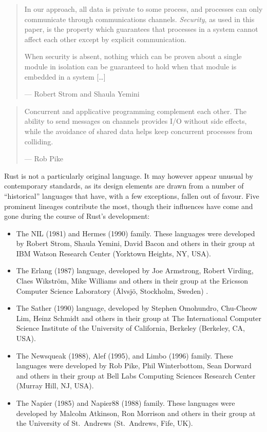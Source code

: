 \documentclass[]{article}
\begin{document}
\begin{quote}
In our approach, all data is private to some process, and processes can
only communicate through communications channels. \emph{Security}, as
used in this paper, is the property which guarantees that processes in a
system cannot affect each other except by explicit communication.

When security is absent, nothing which can be proven about a single
module in isolation can be guaranteed to hold when that module is
embedded in a system {[}\ldots{}{]}

--- Robert Strom and Shaula Yemini
\end{quote}

\begin{quote}
Concurrent and applicative programming complement each other. The
ability to send messages on channels provides I/O without side effects,
while the avoidance of shared data helps keep concurrent processes from
colliding.

--- Rob Pike
\end{quote}

Rust is not a particularly original language. It may however appear
unusual by contemporary standards, as its design elements are drawn from
a number of ``historical'' languages that have, with a few exceptions,
fallen out of favour. Five prominent lineages contribute the most,
though their influences have come and gone during the course of Rust's
development:

\begin{itemize}
\item
  The NIL (1981) and Hermes (1990) family. These languages were
  developed by Robert Strom, Shaula Yemini, David Bacon and others in
  their group at IBM Watson Research Center (Yorktown Heights, NY, USA).
\item
  The Erlang (1987) language, developed by Joe Armstrong, Robert
  Virding, Claes Wikström, Mike Williams and others in their group at
  the Ericsson Computer Science Laboratory (Älvsjö, Stockholm, Sweden) .
\item
  The Sather (1990) language, developed by Stephen Omohundro, Chu-Cheow
  Lim, Heinz Schmidt and others in their group at The International
  Computer Science Institute of the University of California, Berkeley
  (Berkeley, CA, USA).
\item
  The Newsqueak (1988), Alef (1995), and Limbo (1996) family. These
  languages were developed by Rob Pike, Phil Winterbottom, Sean Dorward
  and others in their group at Bell Labs Computing Sciences Research
  Center (Murray Hill, NJ, USA).
\item
  The Napier (1985) and Napier88 (1988) family. These languages were
  developed by Malcolm Atkinson, Ron Morrison and others in their group
  at the University of St.~Andrews (St.~Andrews, Fife, UK).
\end{itemize}
\end{document}
